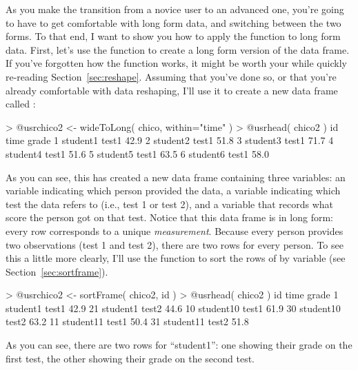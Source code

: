 As you make the transition from a novice user to an advanced one, you're going to have to get comfortable with long form data, and switching between the two forms. To that end, I want to show you how to apply the  function to long form data. First, let's use the  function to create a long form version of the  data frame. If you've forgotten how the   function works, it might be worth your while quickly re-reading Section~\ref{sec:reshape}. Assuming that you've done so, or that you're already comfortable with data reshaping, I'll use it to create a new data frame called :
\begin{rblock1}
> @usr{chico2 <- wideToLong( chico, within="time" )}
> @usr{head( chico2 )}
        id  time grade
1 student1 test1  42.9
2 student2 test1  51.8
3 student3 test1  71.7
4 student4 test1  51.6
5 student5 test1  63.5
6 student6 test1  58.0
\end{rblock1}
As you can see, this has created a new data frame containing three variables: an  variable indicating which person provided the data, a  variable indicating which test the data refers to (i.e., test 1 or test 2), and a  variable that records what score the person got on that test. Notice that this data frame is in long form: every row corresponds to a unique {\it measurement}. Because every person provides two observations (test 1 and test 2), there are two rows for every person. To see this a little more clearly, I'll use the  function to sort the rows of  by  variable (see Section~\ref{sec:sortframe}).
\begin{rblock1}
> @usr{chico2 <- sortFrame( chico2, id )}
> @usr{head( chico2 )}
          id  time grade
1   student1 test1  42.9
21  student1 test2  44.6
10 student10 test1  61.9
30 student10 test2  63.2
11 student11 test1  50.4
31 student11 test2  51.8
\end{rblock1}
As you can see, there are two rows for ``student1'': one showing their grade on the first test, the other showing their grade on the second test. 

